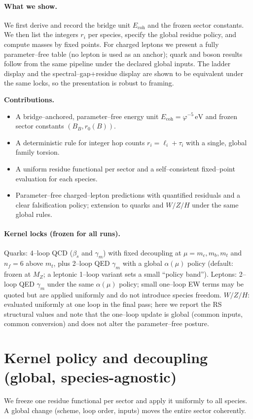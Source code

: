 \documentclass[epjc3]{svjour3}
\begin{document}
\paragraph{What we show.}
We first derive and record the bridge unit $E_{\mathrm{coh}}$ and the frozen sector constants. We then list the integers $r_i$ per species, specify the global residue policy, and compute masses by fixed points. For charged leptons we present a fully parameter–free table (no lepton is used as an anchor); quark and boson results follow from the same pipeline under the declared global inputs. The ladder display and the spectral–gap+residue display are shown to be equivalent under the same locks, so the presentation is robust to framing.

\medskip
\noindent\textbf{Contributions.}
\begin{itemize}
  \item A bridge–anchored, parameter–free energy unit $E_{\mathrm{coh}}=\varphi^{-5}\,\mathrm{eV}$ and frozen sector constants $(B_B,r_0(B))$.
  \item A deterministic rule for integer hop counts $r_i=\ell_i+\tau_i$ with a single, global family torsion.
  \item A uniform residue functional per sector and a self–consistent fixed–point evaluation for each species.
  \item Parameter–free charged–lepton predictions with quantified residuals and a clear falsification policy; extension to quarks and $W/Z/H$ under the same global rules.
\end{itemize}

\medskip
\paragraph{Kernel locks (frozen for all runs).}
Quarks: 4--loop QCD ($\beta_s$ and $\gamma_m$) with fixed decoupling at $\mu=m_c,m_b,m_t$ and $n_f=6$ above $m_t$, plus 2--loop QED $\gamma_m$ with a global $\alpha(\mu)$ policy (default: frozen at $M_Z$; a leptonic 1--loop variant sets a small ``policy band''). Leptons: 2--loop QED $\gamma_m$ under the same $\alpha(\mu)$ policy; small one--loop EW terms may be quoted but are applied uniformly and do not introduce species freedom. $W/Z/H$: evaluated uniformly at one loop in the final pass; here we report the RS structural values and note that the one--loop update is global (common inputs, common conversion) and does not alter the parameter--free posture.

\section*{Kernel policy and decoupling (global, species-agnostic)}
We freeze one residue functional per sector and apply it uniformly to all species. A global change (scheme, loop order, inputs) moves the entire sector coherently.
\end{document}
